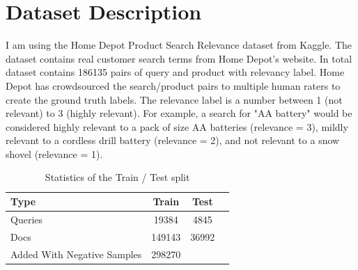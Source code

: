 \documentclass{article}
\begin{document}
\section{Dataset Description}

I am using the Home Depot Product Search Relevance dataset from Kaggle. The dataset contains real customer search terms from Home Depot's website. In total dataset contains 186135 pairs of query and product with relevancy label.  
	Home Depot has crowdsourced the search/product pairs to multiple human raters to create the ground truth labels. The relevance label is a number between 1 (not relevant) to 3 (highly relevant). For example, a search for "AA battery" would be considered highly relevant to a pack of size AA batteries (relevance = 3), mildly relevant to a cordless drill battery (relevance = 2), and not relevant to a snow shovel (relevance = 1).

\begin{table}[tbh!]
\begin{center}
\begin{tabular}[t]{|l|ccc|}
\hline
Type & Train & Test & \\
\hline
Queries & 19384  & 4845  & \\
Docs & 149143 & 36992 & \\
Added With Negative Samples & 298270 & & \\
\hline
\end{tabular}
\caption{Statistics of the Train / Test split}
\label{tab:statistics}
\end{center}
\end{table}
\end{document}
